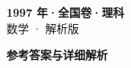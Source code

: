 \documentclass[zihao=-4, a4paper]{ctexart}
\begin{document}
\begin{center}
  {\Large\bfseries 1997 年·全国卷·理科}\\[4pt]
  {\large 数学 · 解析版}
\end{center}
\medskip
{}

\clearpage
{}
\begin{center}{\Large\bfseries 参考答案与详细解析}\end{center}
\medskip

\end{document}
